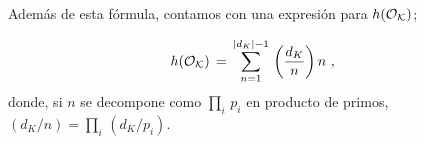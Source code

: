 Adem\'{a}s de esta f\'{o}rmula, contamos con una expresi\'{o}n para $h(\cal{O}_{K})$;

\begin{align*}
 h(\cal{O}_{K}) & \,=\,\sum_{n=1}^{|d_{K}|-1}\,\left(\frac{d_{K}}{n}\right)n
 \text{ ,}
\end{align*}
donde, si $n$ se decompone como $\prod_{i}\,p_{i}$ en producto de primos,
$(d_{K}/n)=\prod_{i}\,(d_{K}/p_{i})$.

%
%
%
%


